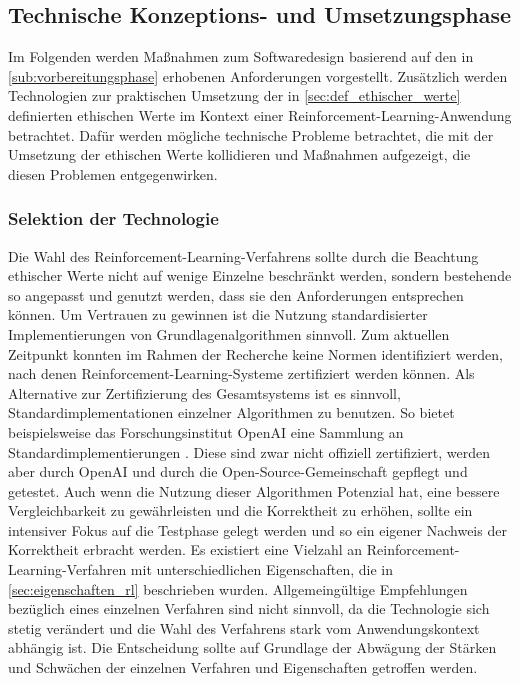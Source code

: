 \subsection{Technische Konzeptions- und Umsetzungsphase}\label{sub:umsetzungsphase}
Im Folgenden werden Maßnahmen zum Softwaredesign basierend auf den in \autoref{sub:vorbereitungsphase} erhobenen Anforderungen vorgestellt.
Zusätzlich werden Technologien zur praktischen Umsetzung der in \autoref{sec:def_ethischer_werte} definierten ethischen Werte im Kontext einer Reinforcement-Learning-Anwendung betrachtet.
Dafür werden mögliche technische Probleme betrachtet, die mit der Umsetzung der ethischen Werte kollidieren und Maßnahmen aufgezeigt, die diesen Problemen entgegenwirken.

\subsubsection{Selektion der Technologie}
Die Wahl des Reinforcement-Learning-Verfahrens sollte durch die Beachtung ethischer Werte nicht auf wenige Einzelne beschränkt werden, sondern bestehende so angepasst und genutzt werden, dass sie den Anforderungen entsprechen können.
Um Vertrauen zu gewinnen ist die Nutzung standardisierter Implementierungen von Grundlagenalgorithmen sinnvoll.
Zum aktuellen Zeitpunkt konnten im Rahmen der Recherche keine Normen identifiziert werden, nach denen Reinforcement-Learning-Systeme zertifiziert werden können.
Als Alternative zur Zertifizierung des Gesamtsystems ist es sinnvoll, Standardimplementationen einzelner Algorithmen zu benutzen.
So bietet beispielsweise das Forschungsinstitut OpenAI \cite{openai} eine Sammlung an Standardimplementierungen \cite{dhariwal2017}.
Diese sind zwar nicht offiziell zertifiziert, werden aber durch OpenAI und durch die Open-Source-Gemeinschaft gepflegt und getestet.
Auch wenn die Nutzung dieser Algorithmen Potenzial hat, eine bessere Vergleichbarkeit zu gewährleisten und die Korrektheit zu erhöhen, sollte ein intensiver Fokus auf die Testphase gelegt werden und so ein eigener Nachweis der Korrektheit erbracht werden.
\ab
Es existiert eine Vielzahl an Reinforcement-Learning-Verfahren mit unterschiedlichen Eigenschaften, die in \autoref{sec:eigenschaften_rl} beschrieben wurden.
Allgemeingültige Empfehlungen bezüglich eines einzelnen Verfahren sind nicht sinnvoll, da die Technologie sich stetig verändert und die Wahl des Verfahrens stark vom Anwendungskontext abhängig ist. 
Die Entscheidung sollte auf Grundlage der Abwägung der Stärken und Schwächen der einzelnen Verfahren und Eigenschaften getroffen werden.
